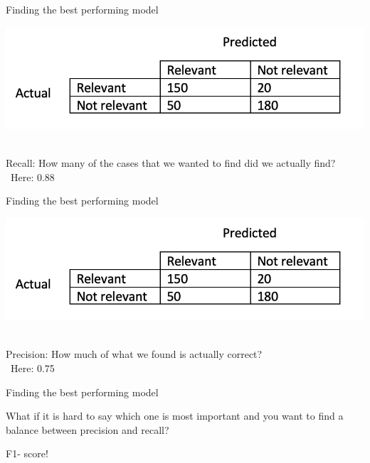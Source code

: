 \documentclass[handout]{beamer}
\begin{document}
\begin{frame}{Finding the best performing model}
\begin{center}
	\includegraphics[width=\linewidth,height=\textheight,keepaspectratio]{../pictures/ConfusionMatrix2.png} \\\
\end{center}
	
Recall: How many of the cases that we wanted to find did we actually find? \\\
Here: 0.88
	
	
\end{frame}



\begin{frame}{Finding the best performing model}
	\begin{center}
		\includegraphics[width=\linewidth,height=\textheight,keepaspectratio]{../pictures/ConfusionMatrix2.png} \\\
	\end{center}
	
	Precision:  How much of what we found is actually correct? \\\
	Here: 0.75
	
	
\end{frame}


\begin{frame}{Finding the best performing model}

What if it is hard to say which one is most important and you want to find a balance between precision and recall?

F1- score!
		
\end{frame}
\end{document}

